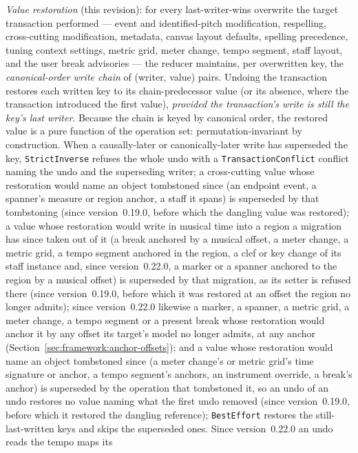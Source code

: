 \documentclass[11pt,letterpaper]{report}
\begin{document}
\emph{Value restoration} (this revision): for every last-writer-wins overwrite
the target transaction performed --- event and identified-pitch modification,
respelling, cross-cutting modification, metadata, canvas layout defaults,
spelling precedence, tuning context settings, metric grid, meter change,
tempo segment, staff layout, and the user break advisories --- the reducer
maintains, per overwritten key, the \emph{canonical-order write chain} of
(writer, value) pairs. Undoing the transaction restores each written key to
its chain-predecessor value (or its absence, where the transaction introduced
the first value), \emph{provided the transaction's write is still the key's
last writer}. Because the chain is keyed by canonical order, the restored
value is a pure function of the operation set: permutation-invariant by
construction. When a causally-later or canonically-later write has
superseded the key, \texttt{StrictInverse} refuses the whole undo with a
\texttt{TransactionConflict} conflict naming the undo and the superseding
writer; a cross-cutting value whose restoration would name an object
tombstoned since (an endpoint event, a spanner's measure or region anchor, a
staff it spans) is superseded by that tombstoning (since version~0.19.0, before
which the dangling value was restored); a value whose restoration would write in musical
time into a region a migration has since taken out of it (a break anchored by
a musical offset, a meter change, a metric grid, a tempo segment anchored in
the region, a clef or key change of its staff instance and, since
version~0.22.0, a marker or a spanner anchored to the region by a musical
offset) is superseded by that migration, as its setter is refused there (since
version~0.19.0, before which it was restored at an offset the region no longer
admits); since version~0.22.0 likewise a marker, a spanner, a metric grid, a
meter change, a tempo segment or a present break whose restoration would anchor
it by any offset its target's model no longer admits, at any anchor
(Section~\ref{sec:framework:anchor-offsets}); and a value whose
restoration would name an object tombstoned since (a meter change's or metric
grid's time signature or anchor, a tempo segment's anchors, an instrument
override, a break's anchor) is superseded by the operation that tombstoned it,
so an undo of an undo restores no value naming what the first undo removed
(since version~0.19.0, before which it restored the dangling reference);
\texttt{BestEffort} restores the still-last-written keys and skips
the superseded ones. Since version~0.22.0 an undo reads the tempo maps its
\end{document}
